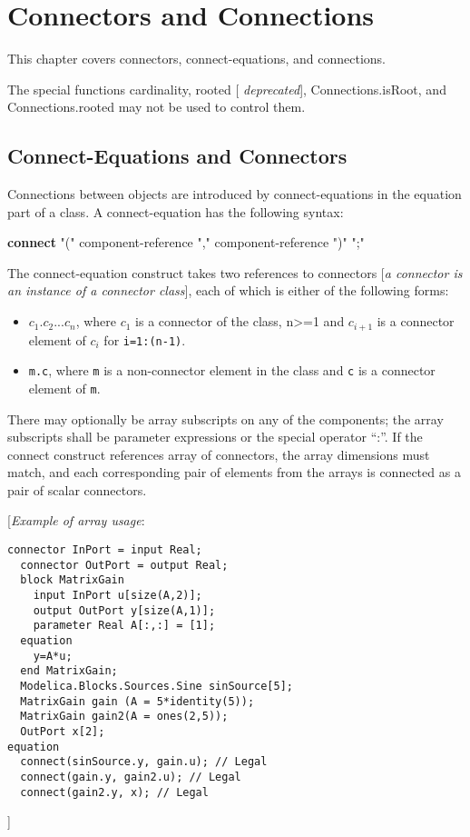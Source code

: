 \chapter{Connectors and Connections}

This chapter covers connectors, connect-equations, and connections.

The special functions cardinality, rooted {[} \emph{deprecated}{]},
Connections.isRoot, and Connections.rooted may not be used to control
them.

\section{Connect-Equations and Connectors}

Connections between objects are introduced by connect-equations in the
equation part of a class. A connect-equation has the following syntax:

\textbf{connect} "(" component-reference "," component-reference ")" ";"

The connect-equation construct takes two references to connectors
{[}\emph{a connector is an instance of a connector class}{]}, each of
which is either of the following forms:

\begin{itemize}
\item
  $c_1.c_2...c_n$,
  where $c_1$ is a connector of the class,
  n\textgreater{}=1 and $c_{i+1}$ is a connector element of
  $c_i$ for \lstinline!i=1:(n-1)!.
\item
  \lstinline!m.c!, where \lstinline!m! is a non-connector element in the class and \lstinline!c! is a
  connector element of \lstinline!m!.
\end{itemize}

There may optionally be array subscripts on any of the components; the
array subscripts shall be parameter expressions or the special operator
``:''. If the connect construct references array of connectors, the
array dimensions must match, and each corresponding pair of elements
from the arrays is connected as a pair of scalar connectors.

{[}\emph{Example of array usage}:

\begin{lstlisting}[language=modelica]
  connector InPort = input Real;
  connector OutPort = output Real;
  block MatrixGain
    input InPort u[size(A,2)];
    output OutPort y[size(A,1)];
    parameter Real A[:,:] = [1];
  equation
    y=A*u;
  end MatrixGain;
  Modelica.Blocks.Sources.Sine sinSource[5];
  MatrixGain gain (A = 5*identity(5));
  MatrixGain gain2(A = ones(2,5));
  OutPort x[2];
equation
  connect(sinSource.y, gain.u); // Legal
  connect(gain.y, gain2.u); // Legal
  connect(gain2.y, x); // Legal
\end{lstlisting}
{]}

